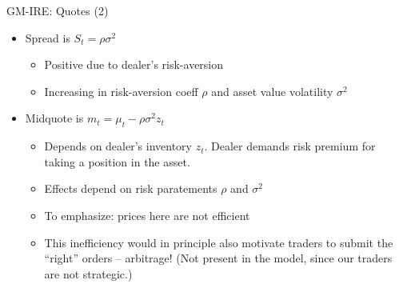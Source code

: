 \documentclass[english,10pt
,aspectratio=169
]{beamer}
\begin{document}
\begin{frame}{GM-IRE: Quotes (2)}
	\begin{itemize}
		\item \alert{Spread} is $S_t = \rho \sigma^2 $
		\begin{itemize}
			\item Positive due to dealer's risk-aversion
			\item Increasing in risk-aversion coeff $\rho$ and asset value volatility $\sigma^2$
		\end{itemize}
		\pause
		\item \alert{Midquote} is $m_t = \mu_t - \rho \sigma^2 z_t$
		\begin{itemize}
			\item Depends on dealer's inventory $z_t$. Dealer demands risk premium for taking a position in the asset.
			\item Effects depend on risk paratements $\rho$ and $\sigma^2$
			\item To emphasize: prices here are \alert{not efficient}
			\item This inefficiency would in principle also motivate traders to submit the ``right'' orders -- arbitrage! (Not present in the model, since our traders are not strategic.)
		\end{itemize}
	\end{itemize}
\end{frame}
\end{document}
